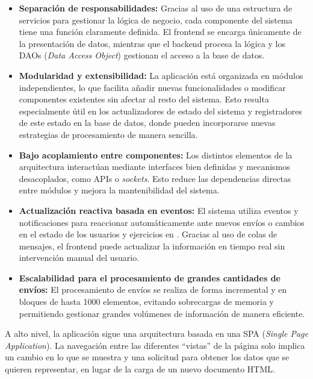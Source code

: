 \begin{itemize}
    \item \textbf{Separación de responsabilidades:} Gracias al uso de una estructura de servicios para gestionar la lógica de negocio, cada componente del sistema tiene una función claramente definida. El frontend se encarga únicamente de la presentación de datos, mientras que el backend procesa la lógica y los DAOs (\textit{Data Access Object}) gestionan el acceso a la base de datos.

    \item \textbf{Modularidad y extensibilidad:} La aplicación está organizada en módulos independientes, lo que facilita añadir nuevas funcionalidades o modificar componentes existentes sin afectar al resto del sistema. Esto resulta especialmente útil en los actualizadores de estado del sistema y registradores de este estado en la base de datos, donde pueden incorporarse nuevas estrategias de procesamiento de manera sencilla. 

    \item \textbf{Bajo acoplamiento entre componentes:} Los distintos elementos de la arquitectura interactúan mediante interfaces bien definidas y mecanismos desacoplados, como APIs o \textit{sockets}. Esto reduce las dependencias directas entre módulos y mejora la mantenibilidad del sistema.

    \item \textbf{Actualización reactiva basada en eventos:} El sistema utiliza eventos y notificaciones para reaccionar automáticamente ante nuevos envíos o cambios en el estado de los usuarios y ejercicios en \aer. Gracias al uso de colas de mensajes, el frontend puede actualizar la información en tiempo real sin intervención manual del usuario.

    \item \textbf{Escalabilidad para el procesamiento de grandes cantidades de envíos:} El procesamiento de envíos se realiza de forma incremental y en bloques de hasta 1000 elementos, evitando sobrecargas de memoria y permitiendo gestionar grandes volúmenes de información de manera eficiente.
\end{itemize}

A alto nivel, la aplicación sigue una arquitectura basada en una SPA (\textit{Single Page Application}). La navegación entre las diferentes ``vistas'' de la página solo implica un cambio en lo que se muestra y una solicitud para obtener los datos que se quieren representar, en lugar de la carga de un nuevo documento HTML.

